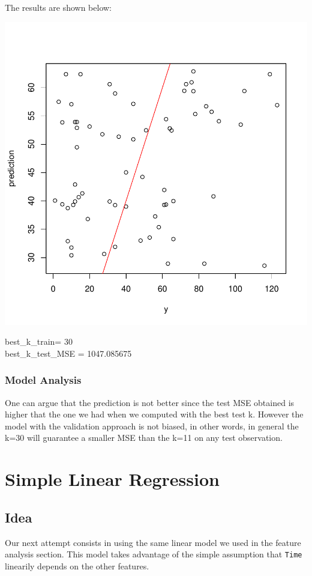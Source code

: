\documentclass[]{report}
\begin{document}
The results are shown below:

\begin{center}
	\includegraphics{Figures/knn_predicted_LOOCV.pdf}
\end{center}

\begin{center} 
	best\_k\_train= 30 \\
	best\_k\_test\_MSE = 1047.085675
\end{center}

\subsubsection{Model Analysis}
One can argue that the prediction is not better since the test MSE obtained is higher that the one we had when we computed with the best test k. However the model with the validation approach is not biased, in other words, in general the k=30 will guarantee a smaller MSE than the k=11 on any test observation.

\section{Simple Linear Regression}
\subsection{Idea}
Our next attempt consists in using the same linear model we used in the feature analysis section. This model takes advantage of the simple assumption that \texttt{Time} linearily depends on the other features.
\end{document}
